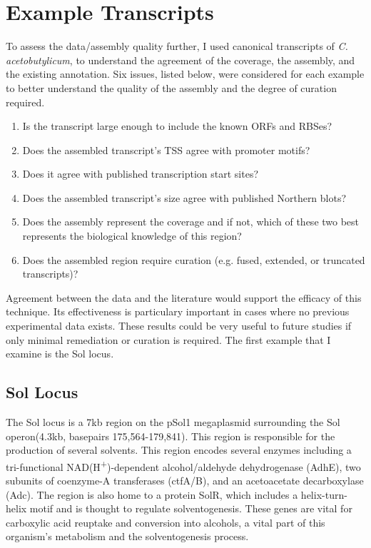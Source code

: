 



\section{Example Transcripts}


To assess the data/assembly quality further, I used canonical transcripts of \textit{C. acetobutylicum}, to understand the agreement of the coverage, the assembly, and the existing annotation. Six issues, listed below, were considered for each example to better understand the quality of the assembly and the degree of curation required. 

\begin{enumerate}
\item Is the transcript large enough to include the known ORFs and RBSes?
\item Does the assembled transcript's TSS agree with promoter motifs?
\item Does it agree with published transcription start sites?
\item Does the assembled transcript's size agree with published Northern blots?
\item Does the assembly represent the coverage and if not, which of these two best represents the biological knowledge of this region?
\item Does the assembled region require curation (e.g. fused, extended, or truncated transcripts)?
\end{enumerate}

Agreement between the data and the literature would support the efficacy of this technique. Its effectiveness is particulary important in cases where no previous experimental data exists. These results could be very useful to future studies if only minimal remediation or curation is required. The first example that I examine is the Sol locus.

\subsection{Sol Locus}

The Sol locus is a 7kb region on the pSol1 megaplasmid surrounding the Sol operon(4.3kb, basepairs 175,564-179,841). This region is responsible for the production of several solvents\cite{62,63}. This region encodes several enzymes including a tri-functional NAD(H\textsuperscript{+})-dependent alcohol/aldehyde dehydrogenase (AdhE)\cite{62}, two subunits of coenzyme-A transferases (ctfA/B)\cite{66}, and an acetoacetate decarboxylase (Adc)\cite{64,65,66}. The region is also home to a protein SolR, which includes a helix-turn-helix motif and is thought to regulate solventogenesis\cite{67}. These genes are vital for carboxylic acid reuptake and conversion into alcohols, a vital part of this organism's metabolism and the solventogenesis process.

